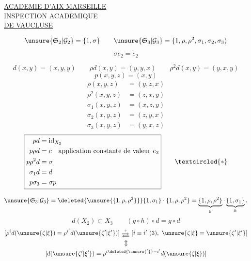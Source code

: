 
\begin{center}
\uline{ACADEMIE D'AIX-MARSEILLE}\\
INSPECTION ACADEMIQUE\\
\uline{DE VAUCLUSE}
\end{center}

\[
\unsure{\mathfrak S_2|\mathcal G_2}=\{1,\sigma\}\qquad
\unsure{\mathfrak S_3|\mathcal G_3}=\{1,\rho,\rho^2,\sigma_1,\sigma_2,\sigma_3)
\]
\margin{$[\rho^3=1,\inserted{\sigma_i^2=1,}\rho\sigma_i\rho^{-1}=\sigma_{i+1}\quad(\sigma_4=\sigma_1)]$}

\[
\sigma e_2=e_2
\]
\margin{$-$}

\[
d(x,y)=(x,y,y)\qquad\rho d(x,y)=(y,y,x)\qquad\rho^2d(x,y)=(y,x,y)
\]
\[
p(x,y,z)=(x,y)
\]
\[
\begin{aligned}
\rho(x,y,z)&=(y,z,x)\\
\rho^2(x,y,z)&=(z,x,y)\\
\sigma_1(x,y,z)&=(x,z,y)\\
\sigma_2(x,y,z)&=(z,y,x)\\
\sigma_3(x,y,z)&=(y,x,z)
\end{aligned}
\]
\[
\boxed{\begin{aligned}
pd&=\mathrm{id}_{X_2}\\
p\rho d&=c\quad\text{application constante de valeur }e_2\\
p\rho^2d&=\sigma\\
\sigma_1d&=d\\
p\sigma_3&=\sigma p
\end{aligned}}\qquad\textcircled{*}
\]

\[
\unsure{\mathfrak S_3|\mathcal G_3}
=\deleted{\unsure{\{1,\rho,\rho^2\}}}\{1,\sigma_1\}\cdot\{1,\rho,\rho^2\}
=\underbrace{\{1,\rho,\rho^2\}}_g\cdot\underbrace{\{1,\sigma_1\}}_h.
\]
\[
d(X_2)\subset X_3\qquad(g\circ h)\circ d=g\circ d
\]
\[
\begin{gathered}
[\rho^i d(\unsure{\zeta|\xi})=\rho^{i'}d(\unsure{\zeta'|\xi'})]
\ \substack{\overset{?}{\Longrightarrow}\\[-2pt]\Longleftarrow}\
[i\equiv i'\ (3),\ \unsure{\zeta|\xi}=\unsure{\zeta'|\xi'}]\\
\Updownarrow\\
[d(\unsure{\zeta'|\xi'})=\rho^{i\deleted{\unsure{'}}-i'}d(\unsure{\zeta|\xi})]
\end{gathered}
\]

